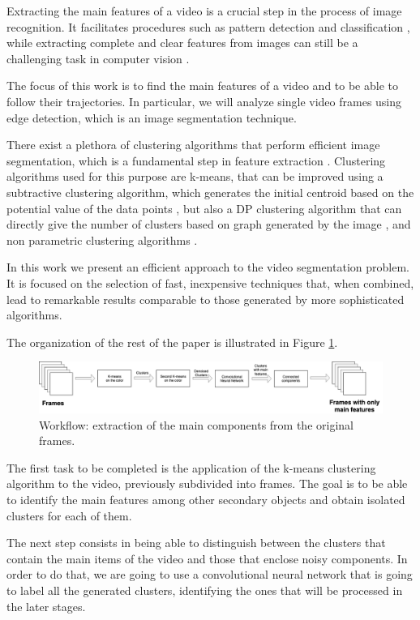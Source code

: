 \documentclass{usiinftr}
\begin{document}
Extracting the main features of a video is a crucial step in the process of image recognition. It facilitates procedures such as pattern detection and classification \cite{4}, while extracting complete and clear features from images can still be a challenging task in computer vision \cite{5}. 

The focus of this work is to find the main features of a video and to be able to follow their trajectories. In particular, we will analyze single video frames using edge detection, which is an image segmentation technique. 

There exist a  plethora of clustering algorithms that perform efficient image segmentation, which is a fundamental step in feature extraction \cite{6}. Clustering algorithms used for this purpose are k-means, that can be improved using a subtractive clustering algorithm, which generates the initial centroid based on the potential value of the data points \cite{7}, but also a DP clustering algorithm that can directly give the number of clusters based on graph generated by the image \cite{8}, and non parametric clustering algorithms \cite{9}.

In this work we present an efficient approach to the video segmentation problem. It is focused on the selection of fast, inexpensive techniques that, when combined, lead to remarkable results comparable to those generated by more sophisticated algorithms.

The organization of the rest of the paper is illustrated in Figure \ref{fig:small}. 
 \begin{figure}[h]
	\centering
	\includegraphics[width=0.95\linewidth]{img/smallflow}
	\caption{Workflow: extraction of the main components from the original frames.}
	\label{fig:small}
\end{figure}
The first task to be completed is the application of the k-means clustering algorithm to the video, previously subdivided into frames. The goal is to be able to identify the main features among other secondary objects and obtain isolated clusters for each of them.

The next step consists in being able to distinguish between the clusters that contain the main items of the video and those that enclose  noisy components. In order to do that, we are going to use a convolutional neural network that is going to label all the generated clusters, identifying the ones that will be processed in the later stages.
\end{document}
